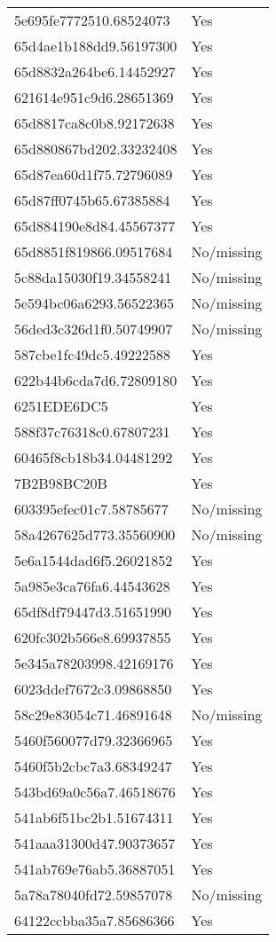 \begin{tabular}{ll}
5e695fe7772510.68524073 & Yes \\
65d4ae1b188dd9.56197300 & Yes \\
65d8832a264be6.14452927 & Yes \\
621614e951c9d6.28651369 & Yes \\
65d8817ca8c0b8.92172638 & Yes \\
65d880867bd202.33232408 & Yes \\
65d87ea60d1f75.72796089 & Yes \\
65d87ff0745b65.67385884 & Yes \\
65d884190e8d84.45567377 & Yes \\
65d8851f819866.09517684 & No/missing \\
5c88da15030f19.34558241 & No/missing \\
5e594bc06a6293.56522365 & No/missing \\
56ded3c326d1f0.50749907 & No/missing \\
587cbe1fc49dc5.49222588 & Yes \\
622b44b6cda7d6.72809180 & Yes \\
6251EDE6DC5 & Yes \\
588f37c76318c0.67807231 & Yes \\
60465f8cb18b34.04481292 & Yes \\
7B2B98BC20B & Yes \\
603395efec01c7.58785677 & No/missing \\
58a4267625d773.35560900 & No/missing \\
5e6a1544dad6f5.26021852 & Yes \\
5a985e3ca76fa6.44543628 & Yes \\
65df8df79447d3.51651990 & Yes \\
620fc302b566e8.69937855 & Yes \\
5e345a78203998.42169176 & Yes \\
6023ddef7672c3.09868850 & Yes \\
58c29e83054c71.46891648 & No/missing \\
5460f560077d79.32366965 & Yes \\
5460f5b2cbc7a3.68349247 & Yes \\
543bd69a0c56a7.46518676 & Yes \\
541ab6f51bc2b1.51674311 & Yes \\
541aaa31300d47.90373657 & Yes \\
541ab769e76ab5.36887051 & Yes \\
5a78a78040fd72.59857078 & No/missing \\
64122ccbba35a7.85686366 & Yes \\

\end{tabular}
